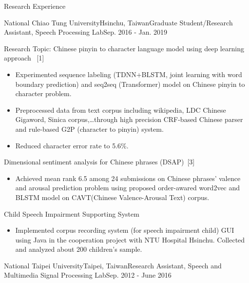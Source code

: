 \documentclass{resume} %
\begin{document}
\begin{rSection}{Research Experience}
    \begin{rSubsection}{National Chiao Tung University}{Hsinchu, Taiwan}{Graduate Student/Research Assistant, Speech Processing Lab}{Sep. 2016 - Jan. 2019}
        \item Research Topic: Chinese pinyin to character language model using deep learning approach ~[1]
        \begin{itemize}[label=$-$]
            \setlength \itemsep{-0.5em}
            \item Experimented sequence labeling (TDNN+BLSTM, joint learning with word boundary prediction) and seq2seq (Transformer) model on Chinese pinyin to character problem. 
            \item Preprocessed data from text corpus including wikipedia, LDC Chinese Gigaword, Sinica corpus,\dots through high precision CRF-based Chinese parser and rule-based G2P (character to pinyin) system.
            \item Reduced character error rate to 5.6\%.
        \end{itemize}\vspace {0.5em}
        \item Dimensional sentiment analysis for Chinese phrases (DSAP)~[3] 
        \begin{itemize}[label=$-$]
            \setlength \itemsep{-0.5em}
            \item Achieved mean rank 6.5 among 24 submissions on Chinese phrases' valence and arousal prediction problem using proposed order-awared word2vec and BLSTM model on CAVT(Chinese Valence-Arousal Text) corpus.
        \end{itemize}\vspace {0.5em}
        \item Child Speech Impairment Supporting System
        \begin{itemize}[label=$-$]
            \setlength \itemsep{-0.5em}
            \item Implemented corpus recording system (for speech impairment child) GUI using Java in the cooperation project with NTU Hospital Hsinchu. Collected and analyzed about 200 children's sample.
        \end{itemize}\vspace {0.5em}
    \end{rSubsection}
    \begin{rSubsection}{National Taipei University}{Taipei, Taiwan}{Research Assistant, Speech and Multimedia Signal Processing Lab}{Sep. 2012 - June 2016}

\end{rSubsection}
\end{rSection}
\end{document}
